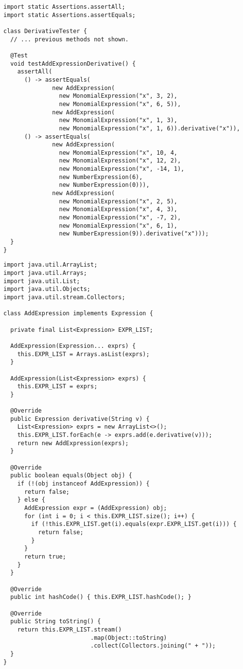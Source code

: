 \begin{lstlisting}[language=MyJava]
import static Assertions.assertAll;
import static Assertions.assertEquals;
  
class DerivativeTester {
  // ... previous methods not shown.

  @Test
  void testAddExpressionDerivative() {
    assertAll(
      () -> assertEquals(
              new AddExpression(
                new MonomialExpression("x", 3, 2),
                new MonomialExpression("x", 6, 5)),
              new AddExpression(
                new MonomialExpression("x", 1, 3),
                new MonomialExpression("x", 1, 6)).derivative("x")),
      () -> assertEquals(
              new AddExpression(
                new MonomialExpression("x", 10, 4,
                new MonomialExpression("x", 12, 2),
                new MonomialExpression("x", -14, 1),
                new NumberExpression(6),
                new NumberExpression(0))),
              new AddExpression(
                new MonomialExpression("x", 2, 5),
                new MonomialExpression("x", 4, 3),
                new MonomialExpression("x", -7, 2),
                new MonomialExpression("x", 6, 1),
                new NumberExpression(9)).derivative("x")));
  }
}
\end{lstlisting}

\begin{lstlisting}[language=MyJava]
import java.util.ArrayList;
import java.util.Arrays;
import java.util.List;
import java.util.Objects;
import java.util.stream.Collectors;

class AddExpression implements Expression {

  private final List<Expression> EXPR_LIST;

  AddExpression(Expression... exprs) {
    this.EXPR_LIST = Arrays.asList(exprs);
  }

  AddExpression(List<Expression> exprs) { 
    this.EXPR_LIST = exprs; 
  }

  @Override
  public Expression derivative(String v) {
    List<Expression> exprs = new ArrayList<>();
    this.EXPR_LIST.forEach(e -> exprs.add(e.derivative(v)));
    return new AddExpression(exprs);
  }

  @Override
  public boolean equals(Object obj) {
    if (!(obj instanceof AddExpression)) { 
      return false; 
    } else { 
      AddExpression expr = (AddExpression) obj;
      for (int i = 0; i < this.EXPR_LIST.size(); i++) {
        if (!this.EXPR_LIST.get(i).equals(expr.EXPR_LIST.get(i))) { 
          return false; 
        }
      }
      return true;
    }
  }

  @Override
  public int hashCode() { this.EXPR_LIST.hashCode(); }

  @Override
  public String toString() { 
    return this.EXPR_LIST.stream()
                         .map(Object::toString)
                         .collect(Collectors.joining(" + "));
  }
}
\end{lstlisting}

